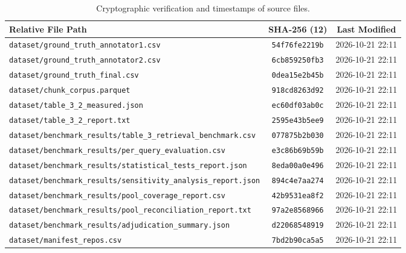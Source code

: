 \begin{table}[htbp]
\caption{Cryptographic verification and timestamps of source files.}
\label{tab:file_provenance}
\centering\scriptsize
\setlength{\tabcolsep}{12pt}
\begin{tabular}{@{}lcc@{}}
\toprule
Relative File Path & SHA-256 (12) & Last Modified \\
\midrule
\texttt{dataset/ground\_truth\_annotator1.csv} & \texttt{54f76fe2219b} & 2026-10-21 22:11 \\
\texttt{dataset/ground\_truth\_annotator2.csv} & \texttt{6cb859250fb3} & 2026-10-21 22:11 \\
\texttt{dataset/ground\_truth\_final.csv} & \texttt{0dea15e2b45b} & 2026-10-21 22:11 \\
\texttt{dataset/chunk\_corpus.parquet} & \texttt{918cd8263d92} & 2026-10-21 22:11 \\
\texttt{dataset/table\_3\_2\_measured.json} & \texttt{ec60df03ab0c} & 2026-10-21 22:11 \\
\texttt{dataset/table\_3\_2\_report.txt} & \texttt{2595e43b5ee9} & 2026-10-21 22:11 \\
\texttt{dataset/benchmark\_results/table\_3\_retrieval\_benchmark.csv} & \texttt{077875b2b030} & 2026-10-21 22:11 \\
\texttt{dataset/benchmark\_results/per\_query\_evaluation.csv} & \texttt{e3c86b69b59b} & 2026-10-21 22:11 \\
\texttt{dataset/benchmark\_results/statistical\_tests\_report.json} & \texttt{8eda00a0e496} & 2026-10-21 22:11 \\
\texttt{dataset/benchmark\_results/sensitivity\_analysis\_report.json} & \texttt{894c4e7aa274} & 2026-10-21 22:11 \\
\texttt{dataset/benchmark\_results/pool\_coverage\_report.csv} & \texttt{42b9531ea8f2} & 2026-10-21 22:11 \\
\texttt{dataset/benchmark\_results/pool\_reconciliation\_report.txt} & \texttt{97a2e8568966} & 2026-10-21 22:11 \\
\texttt{dataset/benchmark\_results/adjudication\_summary.json} & \texttt{d22068548919} & 2026-10-21 22:11 \\
\texttt{dataset/manifest\_repos.csv} & \texttt{7bd2b90ca5a5} & 2026-10-21 22:11 \\
\bottomrule
\end{tabular}
\end{table}